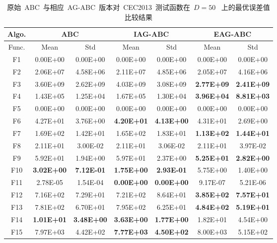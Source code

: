 \begin{table*}[!ht]
  \centering
  \caption{原始~ABC~与相应~AG-ABC~版本对~CEC2013~测试函数在~$D=50$~ 上的最优误差值比较结果}
  \scriptsize
    \begin{tabular}{|c|cc|cc|cc|}
    \hline
    Algo.  & \multicolumn{2}{c|}{ABC} & \multicolumn{2}{c|}{IAG-ABC} & \multicolumn{2}{c|}{EAG-ABC} \\
    \hline
    Func.   & Mean  & Std   & Mean  & Std   & Mean  & Std \\ \hline
    F1    & 0.00E+00 & 0.00E+00 & 0.00E+00 & 0.00E+00 & 0.00E+00 & 0.00E+00 \\
    F2    & 2.06E+07 & 4.58E+06 & 2.11E+07 & 4.85E+06 & 2.05E+07 & 4.16E+06 \\
    F3    & 3.60E+09 & 2.62E+09 & 4.03E+09 & 3.08E+09 & \textbf{2.77E+09} & \textbf{2.41E+09} \\
    F4    & 1.43E+05 & 1.25E+04 & 1.67E+05 & 1.30E+04 & \textbf{3.96E+04} & \textbf{8.81E+03} \\
    F5    & 0.00E+00 & 0.00E+00 & 0.00E+00 & 0.00E+00 & 0.00E+00 & 0.00E+00 \\
    \hline
    F6    & 4.27E+01 & 3.76E+00 & \textbf{4.20E+01} & \textbf{4.13E+00} & 4.31E+01 & 2.69E+00 \\
    F7    & 1.69E+02 & 1.42E+01 & 1.65E+02 & 1.83E+01 & \textbf{1.13E+02} & \textbf{1.44E+01} \\
    F8    & 2.11E+01 & 3.00E-02 & 2.11E+01 & 3.06E-02 & 2.11E+01 & 3.97E-02 \\
    F9    & 5.92E+01 & 1.94E+00 & 5.97E+01 & 2.37E+00 & \textbf{5.25E+01} & \textbf{2.82E+00} \\
    F10   & \textbf{3.02E+00} & \textbf{7.12E-01} & \textbf{1.75E+00} & \textbf{2.93E-01} & 5.75E+00 & 1.40E+00 \\
    F11   & 2.78E-05 & 1.54E-04 & \textbf{0.00E+00} & \textbf{0.00E+00} & 9.17E-07 & 5.21E-06 \\
    F12   & 7.16E+02 & 7.29E+01 & 7.21E+02 & 8.64E+01 & \textbf{3.85E+02} & \textbf{7.57E+01} \\
    F13   & 7.81E+02 & 6.70E+01 & 7.95E+02 & 6.25E+01 & \textbf{4.84E+02} & \textbf{5.19E+01} \\
    F14   & \textbf{1.01E+01} & \textbf{3.48E+00} & \textbf{3.63E+00} & \textbf{1.77E+00} & 1.82E+01 & 4.54E+00 \\
    F15   & 7.97E+03 & 4.42E+02 & \textbf{7.77E+03} & \textbf{4.50E+02} & 8.00E+03 & 5.15E+02 \\

\end{tabular}
\end{table*}
